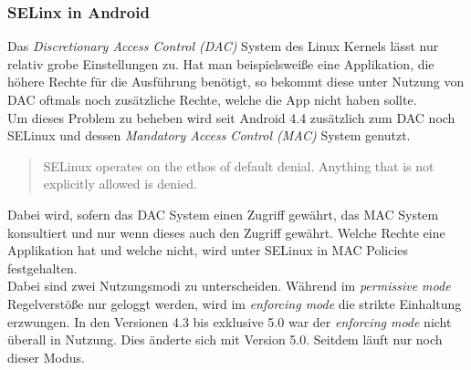 	\subsubsection{SELinx in Android}
	Das \textit{Discretionary Access Control (DAC)} System des Linux Kernels lässt nur relativ grobe Einstellungen zu. Hat man beispielsweiße eine Applikation, die höhere Rechte für die Ausführung benötigt, so bekommt diese unter Nutzung von DAC oftmals noch zusätzliche Rechte, welche die App nicht haben sollte.\\
	Um dieses Problem zu beheben wird seit Android 4.4 zusätzlich zum DAC noch SELinux und dessen \textit{Mandatory Access Control (MAC)} System genutzt.
	\begin{quote}
	SELinux operates on the ethos of default denial. Anything that is not explicitly allowed is denied.\cite{SELinuxAndroid}
	\end{quote}
\begin{flushleft}
	Dabei wird, sofern das DAC System einen Zugriff gewährt, das MAC System konsultiert und nur wenn dieses auch den Zugriff gewährt. Welche Rechte eine Applikation hat und welche nicht, wird unter SELinux in MAC Policies festgehalten.\\
	
	Dabei sind zwei Nutzungsmodi zu unterscheiden. Während im \textit{permissive mode} Regelverstöße nur geloggt werden, wird im \textit{enforcing mode} die strikte Einhaltung erzwungen. In den Versionen 4.3 bis exklusive 5.0 war der \textit{enforcing mode} nicht überall in Nutzung. Dies änderte sich mit Version 5.0. Seitdem läuft nur noch dieser Modus\cite{SELinuxAndroid}.
\end{flushleft}
	
	
	
	